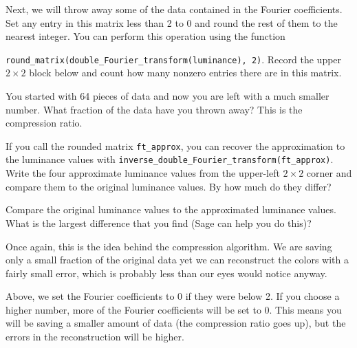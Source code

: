 \documentclass[12pt]{article}
\newcommand{\vs}[1]{\vspace{#1in}}
\begin{document}
\begin{enumerate}
    \vs{1}

    Next, we will throw away some of the data contained in the Fourier
    coefficients.  Set any entry in this matrix less than 2 to 0 and
    round the rest of them to the nearest integer.  You can perform this
    operation using the function

    \noindent
    {\tt round\_matrix(double\_Fourier\_transform(luminance), 2)}.  Record 
    the upper $2\times2$ block below 
    and count how many nonzero entries there are in this matrix.

    \vs{1.5}
    You started with 64 pieces of data and now you are left with a
    much smaller number.  What fraction of the data have you thrown away?
    This is the compression ratio.

    \vs{1}
    \newpage
    If you call the rounded matrix {\tt ft\_approx}, you can recover
    the approximation to the luminance values with
    {\tt inverse\_double\_Fourier\_transform(ft\_approx)}.
    Write the
    four approximate luminance values from the upper-left $2\times2$
    corner and compare them to the original luminance values.  By how
    much do they differ?

    \vs{1}

    Compare the original luminance values to the approximated
    luminance values.  What is the largest difference that you find
    (Sage can help you do this)?

    \vs{1}

    Once again, this is the idea behind the compression algorithm.  We
    are saving only a small fraction of the original data yet we can
    reconstruct the colors with a fairly small error, which is
    probably less than our eyes would notice anyway.

    Above, we set the Fourier coefficients to 0 if they were below
    2.  If you choose a higher number, more of the Fourier
    coefficients will be set to 0.  This means you will be saving a
    smaller amount of data (the compression ratio goes up),
    but the errors in the reconstruction will be higher.
\end{enumerate}
\end{document}
